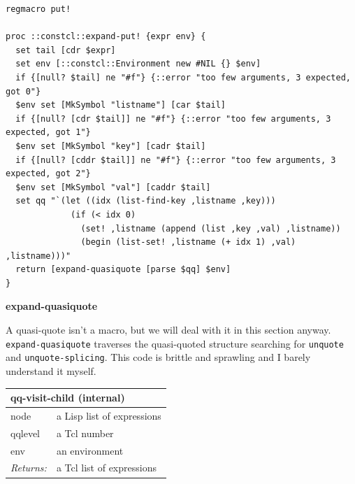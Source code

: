 \documentclass[twoside,9pt]{report}
\begin{document}
\noindent\makebox[\linewidth]{\rule{\linewidth}{0.4pt}}
\begin{lstlisting}
regmacro put!
 
proc ::constcl::expand-put! {expr env} {
  set tail [cdr $expr]
  set env [::constcl::Environment new #NIL {} $env]
  if {[null? $tail] ne "#f"} {::error "too few arguments, 3 expected, got 0"}
  $env set [MkSymbol "listname"] [car $tail]
  if {[null? [cdr $tail]] ne "#f"} {::error "too few arguments, 3 expected, got 1"}
  $env set [MkSymbol "key"] [cadr $tail]
  if {[null? [cddr $tail]] ne "#f"} {::error "too few arguments, 3 expected, got 2"}
  $env set [MkSymbol "val"] [caddr $tail]
  set qq "`(let ((idx (list-find-key ,listname ,key)))
             (if (< idx 0)
               (set! ,listname (append (list ,key ,val) ,listname))
               (begin (list-set! ,listname (+ idx 1) ,val) ,listname)))"
  return [expand-quasiquote [parse $qq] $env]
}
\end{lstlisting}
\noindent\makebox[\linewidth]{\rule{\linewidth}{0.4pt}}

\textbf{expand-quasiquote}


A quasi-quote isn't a macro, but we will deal with it in this section anyway. \texttt{expand-quasiquote} traverses the quasi-quoted structure searching for \texttt{unquote} and \texttt{unquote-splicing}. This code is brittle and sprawling and I barely understand it myself.

\begin{tabular}{ |l l| }
\hline
\multicolumn{2}{|l|}{qq-visit-child (internal)} \\
\hline
node & a Lisp list of expressions \\
qqlevel & a Tcl number \\
env & an environment \\
\textit{Returns:} & a Tcl list of expressions \\
\hline
\end{tabular}
\end{document}

